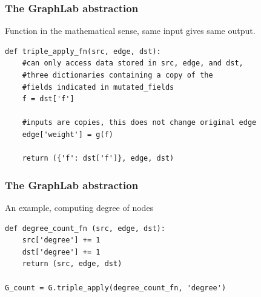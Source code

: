 \documentclass{beamer}
\newcommand{\fdmfamily}{\ttfamily}
\begin{document}
\begin{frame}[fragile]
\frametitle{\bf The GraphLab abstraction}
\begin{center}
\end{center}

Function in the mathematical sense, same input gives same output.

\begin{lstlisting}[basicstyle=\fdmfamily\scriptsize]
def triple_apply_fn(src, edge, dst):
    #can only access data stored in src, edge, and dst,
    #three dictionaries containing a copy of the
    #fields indicated in mutated_fields
    f = dst['f']

    #inputs are copies, this does not change original edge
    edge['weight'] = g(f)

    return ({'f': dst['f']}, edge, dst)
\end{lstlisting}

\end{frame}
\begin{frame}[fragile]
\frametitle{\bf The GraphLab abstraction}
\begin{center}
An example, computing degree of nodes
\end{center}

\begin{lstlisting}[basicstyle=\fdmfamily\scriptsize]
def degree_count_fn (src, edge, dst):
    src['degree'] += 1
    dst['degree'] += 1
    return (src, edge, dst)

G_count = G.triple_apply(degree_count_fn, 'degree')
\end{lstlisting}
\end{frame}
\end{document}
